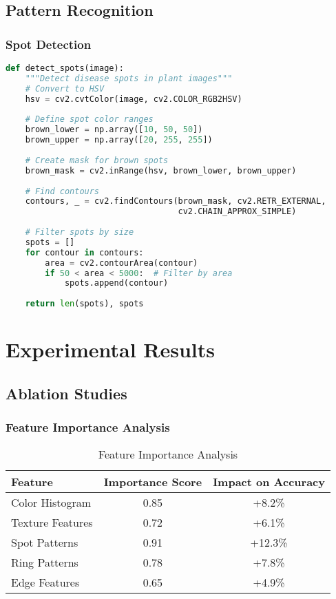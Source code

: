 \documentclass[12pt,a4paper]{article}
\begin{document}
\subsection{Pattern Recognition}

\subsubsection{Spot Detection}
\begin{lstlisting}[language=Python, caption=Spot Pattern Detection]
def detect_spots(image):
    """Detect disease spots in plant images"""
    # Convert to HSV
    hsv = cv2.cvtColor(image, cv2.COLOR_RGB2HSV)
    
    # Define spot color ranges
    brown_lower = np.array([10, 50, 50])
    brown_upper = np.array([20, 255, 255])
    
    # Create mask for brown spots
    brown_mask = cv2.inRange(hsv, brown_lower, brown_upper)
    
    # Find contours
    contours, _ = cv2.findContours(brown_mask, cv2.RETR_EXTERNAL, 
                                   cv2.CHAIN_APPROX_SIMPLE)
    
    # Filter spots by size
    spots = []
    for contour in contours:
        area = cv2.contourArea(contour)
        if 50 < area < 5000:  # Filter by area
            spots.append(contour)
    
    return len(spots), spots
\end{lstlisting}

\section{Experimental Results}

\subsection{Ablation Studies}

\subsubsection{Feature Importance Analysis}
\begin{table}[H]
\centering
\begin{tabular}{|l|c|c|}
\hline
\textbf{Feature} & \textbf{Importance Score} & \textbf{Impact on Accuracy} \\
\hline
Color Histogram & 0.85 & +8.2\% \\
Texture Features & 0.72 & +6.1\% \\
Spot Patterns & 0.91 & +12.3\% \\
Ring Patterns & 0.78 & +7.8\% \\
Edge Features & 0.65 & +4.9\% \\
\hline
\end{tabular}
\caption{Feature Importance Analysis}
\end{table}
\end{document}
